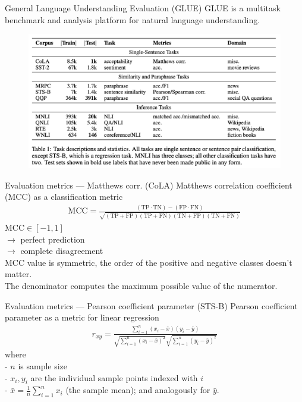 \documentclass[aspectratio=169,xcolor=dvipsnames]{beamer}
\begin{document}
\begin{frame}{General Language Understanding Evaluation (GLUE)}
    GLUE is a multitask benchmark and analysis platform for natural language understanding.
    \bigskip
    \begin{figure}
        \centering
        \label{GLUE}
        \includegraphics[width=0.8 \linewidth]{figures/GLUE.png}
    \end{figure} 
\end{frame}


\begin{frame}{Evaluation metrics --- Matthews corr. (CoLA)}
    Matthews correlation coefficient (MCC) as a classification metric
    \bigskip
    \begin{align*}
        \mathrm{MCC}=\frac{(\mathrm{TP} \cdot \mathrm{TN})-(\mathrm{FP} \cdot \mathrm{FN})}{\sqrt{(\mathrm{TP}+\mathrm{FP})(\mathrm{TP}+\mathrm{FN})(\mathrm{TN}+\mathrm{FP})(\mathrm{TN}+\mathrm{FN})}}
    \end{align*}
    $\text{MCC} \in [-1, 1]$\\
     $\rightarrow$ perfect prediction\\
     $\rightarrow$ complete disagreement\\
    \medskip
    MCC value is symmetric, the order of the positive and negative classes doesn't matter. \\
    \medskip
    The denominator computes the maximum possible value of the numerator.
\end{frame}


\begin{frame}{Evaluation metrics ---  Pearson coefficient parameter (STS-B)}
    Pearson coefficient parameter as a metric for linear regression
    \begin{align*}
        r_{x y}=\frac{\sum_{i=1}^n\left(x_i-\bar{x}\right)\left(y_i-\bar{y}\right)}{\sqrt{\sum_{i=1}^n\left(x_i-\bar{x}\right)^2} \sqrt{\sum_{i=1}^n\left(y_i-\bar{y}\right)^2}}
    \end{align*}
        where \\
        - $n$ is sample size \\
        - $x_i, y_i$ are the individual sample points indexed with $i$ \\
        - $\bar{x}=\frac{1}{n} \sum_{i=1}^n x_i$ (the sample mean); and analogously for $\bar{y}$.
\end{frame}
\end{document}
